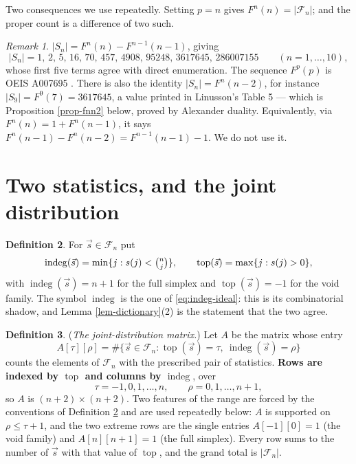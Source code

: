 \documentclass[11pt, a4paper, abstract=yes]{scrartcl}
\theoremstyle{definition}
\newtheorem{definition}{Definition}
\theoremstyle{remark}
\newtheorem{remark}[definition]{Remark}
\theoremstyle{plain}
\newcommand{\indeg}{\operatorname{indeg}}
\newcommand{\tp}{\operatorname{top}}
\begin{document}
Two consequences we use repeatedly. Setting \(p=n\) gives \(F^n(n)=|\mathcal F_n|\); and the
proper count is a difference of two such.

\begin{remark}
\(|S_n|=F^n(n)-F^{n-1}(n-1)\), giving
\begin{equation}\label{eq:auto-10}
  \lvert S_n\rvert = 1,\,2,\,5,\,16,\,70,\,457,\,4908,\,95248,\,3617645,\,286007155
  \qquad(n=1,\dots,10),
\end{equation}
whose first five terms agree with direct enumeration. The sequence \(F^p(p)\) is
OEIS A007695 \autocite{OEIS}. There is also the identity \(|S_n|=F^n(n-2)\), for
instance \(|S_9|=F^9(7)=3617645\), a value printed in Linusson's Table 5 --- which is
Proposition \ref{prop-fnn2} below, proved by Alexander duality. Equivalently, via
\(F^n(n)=1+F^n(n-1)\), it says \(F^n(n-1)-F^n(n-2)=F^{n-1}(n-1)-1\). We do not use it.
\label{obs-fnn2}
\end{remark}
\section{Two statistics, and the joint distribution}
\label{sec-statistics}
\begin{definition}
For \(\vec s\in\mathcal F_n\) put
\begin{equation}\label{eq:auto-11}
  \indeg(\vec s)=\min\lbrace j:s(j)<\tbinom nj\rbrace,\qquad
  \tp(\vec s)=\max\lbrace j:s(j)>0\rbrace,
\end{equation}
with \(\indeg(\vec s)=n+1\) for the full simplex and \(\tp(\vec s)=-1\) for the void family. The
symbol \(\indeg\) is the one of \eqref{eq:indeg-ideal}: this is its combinatorial shadow, and
Lemma \ref{lem-dictionary}(2) is the statement that the two agree.
\label{def-stats}
\end{definition}

\begin{definition}
(\emph{The joint-distribution matrix.}) Let \(A\) be the matrix whose entry
\begin{equation}\label{eq:def-A}
  A[\tau][\rho]=\#\bigl\lbrace \vec s\in\mathcal F_n:\tp(\vec s)=\tau,\ \indeg(\vec s)=\rho\bigr\rbrace
\end{equation}
counts the elements of \(\mathcal F_n\) with the prescribed pair of statistics. \textbf{Rows are indexed by
\(\tp\) and columns by \(\indeg\)}, over
\begin{equation}\label{eq:def-A-range}
  \tau=-1,0,1,\dots,n,\qquad \rho=0,1,\dots,n+1 ,
\end{equation}
so \(A\) is \((n+2)\times(n+2)\). Two features of the range are forced by the conventions of
Definition \ref{def-stats} and are used repeatedly below: \(A\) is supported on \(\rho\le\tau+1\), and
the two extreme rows are the single entries \(A[-1][0]=1\) (the void family) and \(A[n][n+1]=1\)
(the full simplex). Every row sums to the number of \(\vec s\) with that value of \(\tp\), and the
grand total is \(\lvert\mathcal F_n\rvert\).
\label{def-A}
\end{definition}
\end{document}
